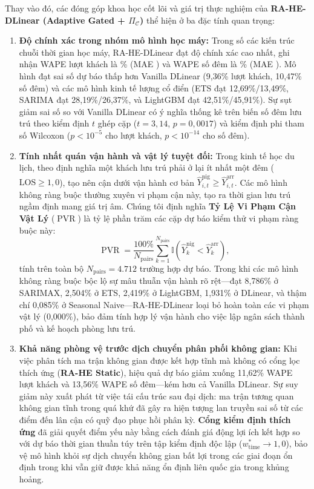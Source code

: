 \documentclass[10pt,journal,compsoc]{IEEEtran}
\begin{document}
Thay vào đó, các đóng góp khoa học cốt lõi và giá trị thực nghiệm của \textbf{RA-HE-DLinear (Adaptive Gated + $\Pi_{\mathcal{C}}$)} thể hiện ở ba đặc tính quan trọng:
\begin{enumerate}
    \item \textbf{Độ chính xác trong nhóm mô hình học máy:} Trong số các kiến trúc chuỗi thời gian học máy, RA-HE-DLinear đạt độ chính xác cao nhất, ghi nhận WAPE lượt khách là \ReviewerArrivalWAPE{}\% (MAE \ReviewerArrivalMAE{}) và WAPE số đêm là \ReviewerNightsWAPE{}\% (MAE \ReviewerNightsMAE{}). Mô hình đạt sai số dự báo thấp hơn Vanilla DLinear (9,36\% lượt khách, 10,47\% số đêm) và các mô hình kinh tế lượng cổ điển (ETS đạt 12,69\%/13,49\%, SARIMA đạt 28,19\%/26,37\%, và LightGBM đạt 42,51\%/45,91\%). Sự sụt giảm sai số so với Vanilla DLinear có ý nghĩa thống kê trên biến số đêm lưu trú theo kiểm định $t$ ghép cặp ($t = 3{,}14$, $p = 0{,}0017$) và kiểm định phi tham số Wilcoxon ($p < 10^{-5}$ cho lượt khách, $p < 10^{-14}$ cho số đêm).
    \item \textbf{Tính nhất quán vận hành và vật lý tuyệt đối:} Trong kinh tế học du lịch, theo định nghĩa một khách lưu trú phải ở lại ít nhất một đêm ($\text{LOS} \ge 1{,}0$), tạo nên cận dưới vận hành cơ bản $\hat{Y}_{i,t}^{\mathrm{nig}} \ge \hat{Y}_{i,t}^{\mathrm{arr}}$. Các mô hình không ràng buộc thường xuyên vi phạm cận này, tạo ra thời gian lưu trú ngầm định mang giá trị âm. Chúng tôi định nghĩa \textbf{Tỷ Lệ Vi Phạm Cận Vật Lý} ($\operatorname{PVR}$) là tỷ lệ phần trăm các cặp dự báo kiểm thử vi phạm ràng buộc này:
    \begin{equation}
    \operatorname{PVR} = \frac{100\%}{N_{\mathrm{pairs}}} \sum_{k=1}^{N_{\mathrm{pairs}}} \mathbb{I}\left(\hat{Y}_k^{\mathrm{nig}} < \hat{Y}_k^{\mathrm{arr}}\right),
    \label{eq:physical_violation_rate}
    \end{equation}
    tính trên toàn bộ $N_{\mathrm{pairs}} = 4.712$ trường hợp dự báo. Trong khi các mô hình không ràng buộc bộc lộ sự mâu thuẫn vận hành rõ rệt---đạt 8,786\% ở SARIMAX, 2,504\% ở ETS, 2,419\% ở LightGBM, 1,931\% ở DLinear, và thậm chí 0,085\% ở Seasonal Naive---RA-HE-DLinear loại bỏ hoàn toàn các vi phạm vật lý (0,000\%), bảo đảm tính hợp lý vận hành cho việc lập ngân sách thành phố và kế hoạch phòng lưu trú.
    \item \textbf{Khả năng phòng vệ trước dịch chuyển phân phối không gian:} Khi việc phân tích ma trận không gian được kết hợp tĩnh mà không có cổng lọc thích ứng (\textbf{RA-HE Static}), hiệu quả dự báo giảm xuống 11,62\% WAPE lượt khách và 13,56\% WAPE số đêm---kém hơn cả Vanilla DLinear. Sự suy giảm này xuất phát từ việc tái cấu trúc sau đại dịch: ma trận tương quan không gian tĩnh trong quá khứ đã gây ra hiện tượng lan truyền sai số từ các điểm đến lân cận có quỹ đạo phục hồi phân kỳ. \textbf{Cổng kiểm định thích ứng} đã giải quyết điểm yếu này bằng cách đánh giá động lợi ích kết hợp so với dự báo thời gian thuần túy trên tập kiểm định độc lập ($w_{\mathrm{time}}^* \to 1{,}0$), bảo vệ mô hình khỏi sự dịch chuyển không gian bất lợi trong các giai đoạn ổn định trong khi vẫn giữ được khả năng ổn định liên quốc gia trong khủng hoảng.
\end{enumerate}
\end{document}
